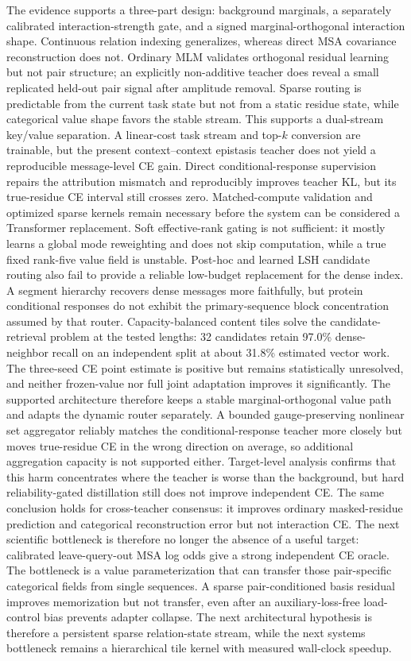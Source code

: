 \documentclass[10pt]{article}
\begin{document}
The evidence supports a three-part design: background marginals, a separately calibrated
interaction-strength gate, and a signed marginal-orthogonal interaction shape.  Continuous
relation indexing generalizes, whereas direct MSA covariance reconstruction does not.  Ordinary
MLM validates orthogonal residual learning but not pair structure; an explicitly non-additive
teacher does reveal a small replicated held-out pair signal after amplitude removal.  Sparse
routing is predictable from the current task state but not from a static residue state, while
categorical value shape favors the stable stream.  This supports a dual-stream key/value
separation.  A linear-cost task stream and top-$k$ conversion are trainable, but the present
context--context epistasis teacher does not yield a reproducible message-level CE gain.  Direct
conditional-response supervision repairs the attribution mismatch and reproducibly improves
teacher KL, but its true-residue CE interval still crosses zero.  Matched-compute validation and
optimized sparse kernels remain necessary before the system can be considered a Transformer
replacement.  Soft effective-rank gating is not sufficient: it mostly learns a global mode
reweighting and does not skip computation, while a true fixed rank-five value field is unstable.
Post-hoc and learned LSH candidate routing also fail to provide a reliable low-budget replacement
for the dense index.  A segment hierarchy recovers dense messages more faithfully, but protein
conditional responses do not exhibit the primary-sequence block concentration assumed by that
router.  Capacity-balanced content tiles solve the candidate-retrieval problem at the tested
lengths: 32 candidates retain 97.0\% dense-neighbor recall on an independent split at about
31.8\% estimated vector work.  The three-seed CE point estimate is positive but remains
statistically unresolved, and neither frozen-value nor full joint adaptation improves it
significantly.  The supported architecture therefore keeps a stable marginal-orthogonal value
path and adapts the dynamic router separately.  A bounded gauge-preserving nonlinear set
aggregator reliably matches the conditional-response teacher more closely but moves true-residue
CE in the wrong direction on average, so additional aggregation capacity is not supported either.
Target-level analysis confirms that this harm concentrates where the teacher is worse than the
background, but hard reliability-gated distillation still does not improve independent CE.  The
same conclusion holds for cross-teacher consensus: it improves ordinary masked-residue prediction
and categorical reconstruction error but not interaction CE.  The next scientific bottleneck is
therefore no longer the absence of a useful target: calibrated leave-query-out MSA log odds give
a strong independent CE oracle.  The bottleneck is a value parameterization that can transfer
those pair-specific categorical fields from single sequences.  A sparse pair-conditioned basis
residual improves memorization but not transfer, even after an auxiliary-loss-free load-control
bias prevents adapter collapse.  The next architectural hypothesis is therefore a persistent
sparse relation-state stream, while the next systems bottleneck remains a hierarchical tile
kernel with measured wall-clock speedup.
\end{document}
